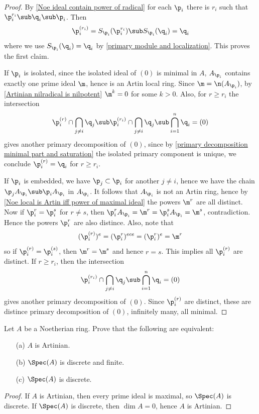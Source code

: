\begin{proof}
By \cref{Noe ideal contain power of radical} for each $\p_i$ there is $r_i$ such that $\p_i^{r_i}\sub\q_i\sub\p_i$. Then
\[\p_i^{(r_i)}=S_{\p_i}(\p_i^{r_i})\sub S_{\p_i}(\q_i)=\q_i\]
where we use $S_{\p_i}(\q_i)=\q_i$ by \cref{primary module and localization}. This proves the first claim.\par
If $\p_i$ is isolated, since the isolated ideal of $(0)$ is minimal in $A$, $A_{\p_i}$ contains exactly one prime ideal $\m$, hence is an Artin local ring. Since $\m=\n(A_{\p_i})$, by \cref{Artinian nilradical is nilpotent} $\m^k=0$ for some $k>0$. Also, for $r\geq r_i$ the intersection
\[\p_i^{(r)}\cap\bigcap_{j\neq i}\q_j\sub\p_i^{(r_i)}\cap\bigcap_{j\neq i}\q_j\sub\bigcap_{i=1}^{n}\q_i=(0)\] 
gives another primary decomposition of $(0)$, since by \cref{primary decomposition minimal part and saturation} the isolated primary component is unique, we conclude $\p_i^{(r)}=\q_i$ for $r\geq r_i$.\par
If $\p_i$ is embedded, we have $\p_j\subset\p_i$ for another $j\neq i$, hence we have the chain $\p_jA_{\p_i}\sub \p_iA_{\p_i}$ in $A_{\p_i}$. It follows that $A_{\p_i}$ is not an Artin ring, hence by \cref{Noe local is Artin iff power of maximal ideal} the powers $\m^r$ are all distinct. Now if $\p_i^r=\p_i^s$ for $r\neq s$, then $\p_i^rA_{\p_i}=\m^r=\p_i^sA_{\p_i}=\m^s$, contradiction. Hence the powers $\p_i^r$ are also distince. Also, note that
\[(\p_i^{(r)})^e=(\p_i^r)^{ece}=(\p_i^r)^e=\m^r\]
so if $\p_i^{(r)}=\p_i^{(s)}$, then $\m^r=\m^s$ and hence $r=s$. This implies all $\p_i^{(r)}$ are distinct. If $r\geq r_i$, then the intersection
\[\p_i^{(r_i)}\cap\bigcap_{j\neq i}\q_j\sub\bigcap_{i=1}^{n}\q_i=(0)\] 
gives another primary decomposition of $(0)$. Since $\p_i^{(r)}$ are distinct, these are distince primary decomposition of $(0)$, infinitely many, all minimal.
\end{proof}
\begin{exercise}\label{spec discrete iff Art}
Let $A$ be a Noetherian ring. Prove that the following are equivalent:
\begin{itemize}
\item[(a)] $A$ is Artinian.
\item[(b)] $\Spec(A)$ is discrete and finite.
\item[(c)] $\Spec(A)$ is discrete.
\end{itemize}
\end{exercise}
\begin{proof}
If $A$ is Artinian, then every prime ideal is maximal, so $\Spec(A)$ is discrete. If $\Spec(A)$ is discrete, then $\dim A=0$, hence $A$ is Artinian.
\end{proof}
